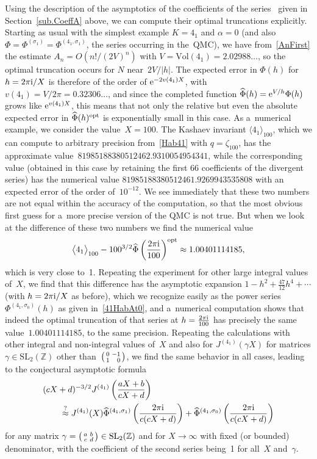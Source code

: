 \documentclass[pdftex]{sigma}
\numberwithin{equation}{section}
\def\SL{\mathrm{SL}}
\def\z{\zeta}
\def\Vol{\mathrm{Vol}}
\def\Phih{\widehat\Phi}
\def\a{\alpha}
\def\Z{\mathbb Z}
\def\m{ - }
\def\a{\alpha}
\def\z{\zeta}
\def\s{\sigma}
\def\sma#1#2#3#4{\bigl(\smallmatrix#1&#2\\#3&#4\endsmallmatrix\bigr)} %
\def\O{O}
\def\J{\mathbf J} \def\J{J} %
\def\g{\gamma}
\begin{document}
Using the description of the asymptotics of the coefficients of the
series~\smash{$\Phi^{(K,\s)}_\a(h)$} given in Section~\ref{sub.CoeffA} above, we can
compute their optimal truncations explicitly. Starting as usual with the
simplest example $K=4_1$ and $\a=0$ \big(and also $\Phi=\Phi^{(\s_1)}=\Phi^{(4_1,\s_1)}$,
the series occurring in the~QMC\big), we have from~\eqref{AnFirst} the estimate
$A_n=\O(n!/(2V)^n)$ with ${V=\Vol(4_1)=2.02988\dots}$, so the optimal truncation
occurs for $N$ near~$2V/|h|$. The expected error in $\Phi(h)$ for ${h=2\pi {\rm i}/X}$
is therefore of the order of ${\rm e}^{-2v(4_1)X}$, with $v(4_1)=V/2\pi=0.32306\dots$,
and since the completed function $\Phih(h)={\rm e}^{V/h}\Phi(h)$ grows like
${\rm e}^{v(4_1)X}$, this means that not only the relative but even the absolute expected
error in $\Phih(h)^{{\rm opt}}$ is exponentially small in this case. As a~numerical example, we consider the value~$X=100$. The Kashaev invariant
$\langle 4_1\rangle_{100}$, which we can compute to arbitrary precision
from~\eqref{Hab41} with $q\!=\!\z_{100}$, has the approximate value~$81985188380512462.9310054954341$, while the corresponding value
\smash{$100^{3/2} \Phih\bigl(\frac{2\pi {\rm i}}{100}\bigr)^{{\rm opt}}$} (obtained in this
case by retaining the first 66 coefficients of the divergent series) has the
numerical value $81985188380512461.9269943535808$ with an expected error of the
order of~$10^{-12}$. We see immediately that these two numbers are not equal
within the accuracy of the computation, so that the most obvious first guess for a~more precise version of the QMC is not true. But when we look at the difference
of these two numbers we find the numerical value
\[
\big\langle 4_1\big\rangle_{100} \m
100^{3/2} \Phih\left(\frac{2\pi {\rm i}}{100}\right)^{{\rm opt}} \approx 1.00401114185 ,
\]
which is very close to~1. Repeating the experiment for other large integral
values of~$X$, we find that this difference has the asymptotic expansion
$1-h^2+\frac{47}{12}h^4+\cdots$
(with $h=2\pi {\rm i}/X$ as before), which we recognize easily as the power series
$\Phi^{(4_1,\s_0)}(h)$ as given in~\eqref{41HabAt0}, and a~numerical computation
shows that indeed the optimal truncation of that series at $h=\frac{2\pi {\rm i}}{100}$
has precisely the same value~$1.00401114185$, to the same precision. Repeating the
calculations with other integral and non-integral values of~$X$ and also for
$\J^{(4_1)}(\g X)$ for matrices $\g\in\SL_2(\Z)$ other than~$\sma0{-1}1{\hphantom{-}0}$,
we find the same behavior in all cases, leading to the conjectural asymptotic formula
\begin{align}
& (cX+d)^{-3/2} \J^{(4_1)}\left(\frac{aX+b}{cX+d}\right) \nonumber\\
 &\qquad \overset?\approx{}
 \J^{(4_1)}(X) \Phih^{(4_1,\s_1)}\left(\frac{2\pi {\rm i}}{c(cX+d)}\right)
  + \Phih^{(4_1,\s_0)}\left(\frac{2\pi {\rm i}}{c(cX+d)}\right)\label{FirstRQMC}
\end{align}
for any matrix $\g=\sma abcd\in\SL_2(\Z)$ and for $X\to\infty$ with fixed
(or bounded) denominator, with the coefficient of the second series
\smash{$\Phih^{(4_1,\s_0)}$} being~1 for all~$X$ and~$\g$.
\end{document}
